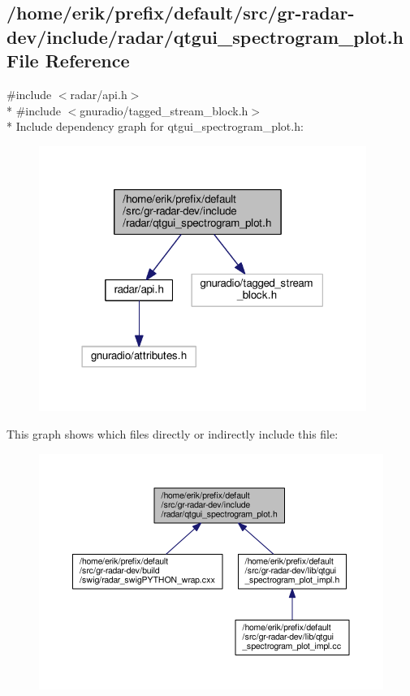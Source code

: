 \subsection{/home/erik/prefix/default/src/gr-\/radar-\/dev/include/radar/qtgui\+\_\+spectrogram\+\_\+plot.h File Reference}
\label{qtgui__spectrogram__plot_8h}
{\ttfamily \#include $<$radar/api.\+h$>$}\\*
{\ttfamily \#include $<$gnuradio/tagged\+\_\+stream\+\_\+block.\+h$>$}\\*
Include dependency graph for qtgui\+\_\+spectrogram\+\_\+plot.\+h\+:
\nopagebreak
\begin{figure}[H]
\begin{center}
\leavevmode
\includegraphics[width=302pt]{dc/d3c/qtgui__spectrogram__plot_8h__incl}
\end{center}
\end{figure}
This graph shows which files directly or indirectly include this file\+:
\nopagebreak
\begin{figure}[H]
\begin{center}
\leavevmode
\includegraphics[width=350pt]{de/d0f/qtgui__spectrogram__plot_8h__dep__incl}
\end{center}
\end{figure}
